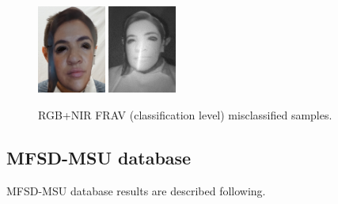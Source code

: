 \begin{figure}[htb]
\centering
\includegraphics[width=0.2\textwidth]{images_databases/frav_rgb_128.JPG}
\includegraphics[width=0.2\textwidth]{images_databases/frav_nir_128.jpg}
\caption{RGB+NIR FRAV (classification level) misclassified samples.} \label{fig:frav_clas_miscl}
\end{figure}

\subsection{MFSD-MSU database}
MFSD-MSU database results are described following.\\

